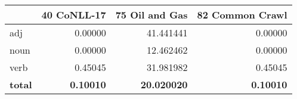 \begin{tabular}{lrrr}
\toprule
{} &  40 CoNLL-17 &  75 Oil and Gas &  82 Common Crawl \\
\midrule
adj   &      0.00000 &       41.441441 &          0.00000 \\
noun  &      0.00000 &       12.462462 &          0.00000 \\
verb  &      0.45045 &       31.981982 &          0.45045 \\
\textbf{total} &      \textbf{0.10010} &       \textbf{20.020020} &          \textbf{0.10010} \\
\bottomrule
\end{tabular}
